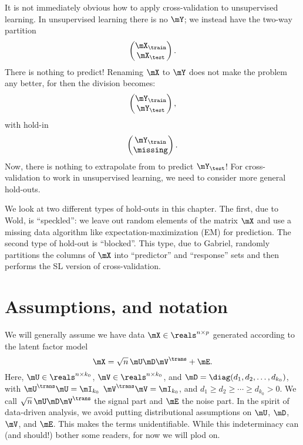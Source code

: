 It is not immediately obvious how to apply cross-validation to unsupervised
learning.  In unsupervised learning there is no $\mY$; we instead have the 
two-way partition
\[
    \left(
    \begin{matrix}
        \mX_\train \\
        \mX_\test
    \end{matrix}
    \right).
\]
There is nothing to predict!  Renaming $\mX$ to $\mY$ does not make the
problem any better, for then the division becomes:
\[
    \left(
    \begin{matrix}
        \mY_\train \\
        \mY_\test
    \end{matrix}
    \right),
\]
with hold-in
\[
    \left(
    \begin{matrix}
        \mY_\train \\
        \missing
    \end{matrix}
    \right).
\]
Now, there is nothing to extrapolate from to predict $\mY_\test$!  For 
cross-validation to work in unsupervised learning, we need to consider
more general hold-outs.

We look at two different types of hold-outs in this chapter. The first, due to
Wold, is ``speckled'': we leave out random elements of the matrix $\mX$ and
use a missing data algorithm like expectation-maximization (EM) for
prediction. The second type of hold-out is ``blocked''. This type, due to
Gabriel, randomly partitions the columns of $\mX$ into ``predictor'' and
``response'' sets and then performs the SL version of cross-validation.

\section{Assumptions, and notation}\label{S:ucv-assumptions-notation}

We will generally assume we have data $\mX \in \reals^{n \times p}$
generated according to the latent factor model 
\[
    \mX = \sqrt{n} \, \mU \mD \mV^\trans + \mE.
\]
Here, $\mU \in \reals^{n \times k_0}$, $\mV \in \reals^{n \times k_0}$, and
$\mD = \diag( d_1, d_2, \ldots, d_{k_0} )$, with $\mU^\trans \mU = \mI_{k_0}$
$\mV^\trans \mV = \mI_{k_0}$, and $d_1 \geq d_2 \geq \cdots \geq d_{k_0} > 0$. We call $\sqrt{n} \, \mU \mD \mV^\trans$ the
signal part and $\mE$ the noise part. In the spirit of data-driven analysis,
we avoid putting distributional assumptions on $\mU$, $\mD$, $\mV$, and $\mE$.
This makes the terms unidentifiable.  While this indeterminacy can (and 
should!) bother some readers, for now we will plod on.

